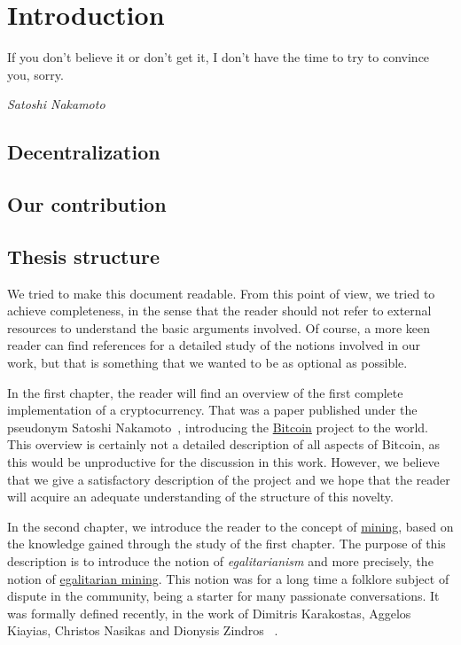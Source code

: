 \chapter{Introduction}
%
\epigraph{If you don’t believe it or don’t get it, I don’t have the time to try to convince you, sorry.}{\textit{Satoshi Nakamoto}}
%

\section{Decentralization}

\section{Our contribution}

\section{Thesis structure}
We tried to make this document readable. From this point of view, we tried to achieve completeness, in the sense that the reader should not refer to external resources to understand the basic arguments involved. Of course, a more keen reader can find references for a detailed study of the notions involved in our work, but that is something that we wanted to be as optional as possible.

In the first chapter, the reader will find an overview of the first complete implementation of a cryptocurrency. That was a paper published under the pseudonym Satoshi Nakamoto~\cite{Nakamoto_bitcoin:a}, introducing the \hyperref[sec:Bitcoin]{Bitcoin} project to the world. This overview is certainly not a detailed description of all aspects of Bitcoin, as this would be unproductive for the discussion in this work. However, we believe that we give a satisfactory description of the project and we hope that the reader will acquire an adequate understanding of the structure of this novelty.

In the second chapter, we introduce the reader to the concept of \hyperref[sec:mining]{mining}, based on the knowledge gained through the study of the first chapter. The purpose of this description is to introduce the notion of \emph{egalitarianism} and more precisely, the notion of \hyperref[sec:egalitarian]{egalitarian mining}. This notion was for a long time a folklore subject of dispute in the community, being a starter for many passionate conversations. It was formally defined recently, in the work of Dimitris Karakostas, Aggelos Kiayias, Christos Nasikas and Dionysis Zindros ~\cite{egalitarianism}.

